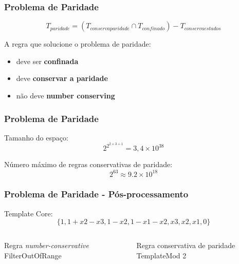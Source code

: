 \documentclass[aspectratio=43,hyperref={pdfpagelabels=false}]{beamer}
\begin{document}
\begin{frame}
    \frametitle{Problema de Paridade}
    \begin{equation}
    T_{paridade} = (T_{conservaparidade} \cap T_{confinado}) - T_{conservaestados}
    \label{eq:operationsTemplateParidade}
    \end{equation}

    \begin{alertblock}{A regra que solucione o problema de paridade:}
        \vspace{-0.4cm}    
        \begin{itemize}
          \item deve ser \textbf{confinada}
          \item deve \textbf{conservar a paridade}
          \item não deve \textbf{number conserving}
        \end{itemize}
    \end{alertblock}
\end{frame}

\begin{frame}
    \frametitle{Problema de Paridade}

    Tamanho do espaço:
    \begin{equation}
    2^{2^{2\times3+1}}=3,4 \times 10^{38}
    \end{equation}

    Número máximo de regras conservativas de paridade:
    \begin{equation}
    2^{63} \approx  9.2\times 10^{18}
    \end{equation}
\end{frame}


\begin{frame}
    \frametitle{Problema de Paridade - Pós-processamento}

    Template Core:
    \begin{equation}
    \{1, 1 + x2 - x3, 1 - x2, 1 - x1 - x2, x3, x2, x1, 0\}
    \end{equation}

    \begin{columns}
      \begin{column}{5cm}
      Regra \emph{number-conservative}
      FilterOutOfRange
      \end{column}
      
      \begin{column}{5cm}
      Regra conservativa de paridade
      TemplateMod 2
      \end{column}
    \end{columns}
\end{frame}
\end{document}
